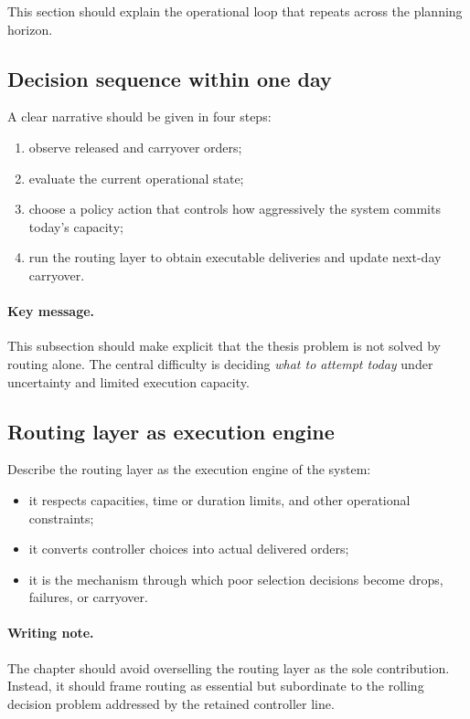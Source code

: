 This section should explain the operational loop that repeats across the planning horizon.

\subsection{Decision sequence within one day}
\label{subsec:arch_daily_loop}

A clear narrative should be given in four steps:
\begin{enumerate}
    \item observe released and carryover orders;
    \item evaluate the current operational state;
    \item choose a policy action that controls how aggressively the system commits today's capacity;
    \item run the routing layer to obtain executable deliveries and update next-day carryover.
\end{enumerate}

\paragraph{Key message.}
This subsection should make explicit that the thesis problem is not solved by routing alone. The central difficulty is deciding \emph{what to attempt today} under uncertainty and limited execution capacity.

\subsection{Routing layer as execution engine}
\label{subsec:arch_routing_layer}

Describe the routing layer as the execution engine of the system:
\begin{itemize}
    \item it respects capacities, time or duration limits, and other operational constraints;
    \item it converts controller choices into actual delivered orders;
    \item it is the mechanism through which poor selection decisions become drops, failures, or carryover.
\end{itemize}

\paragraph{Writing note.}
The chapter should avoid overselling the routing layer as the sole contribution. Instead, it should frame routing as essential but subordinate to the rolling decision problem addressed by the retained controller line.

